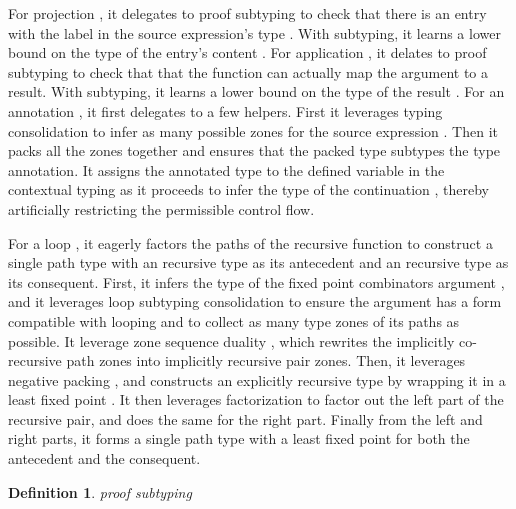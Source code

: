\documentclass[table,dvipsnames,acmsmall]{acmart}
\theoremstyle{definition}
\newtheorem{definition}{Definition}[section]
\begin{document}
For projection , 
it delegates to proof subtyping 
to check that there is an entry with the label 
in the source expression's type \ms{\tau}.
With subtyping, it learns a lower bound on the type of the entry's content \ms{\alpha}.
For application , 
it delates to proof subtyping 
to check that that the function  can actually
map the argument  to a result. With subtyping, 
it learns a lower bound on the type of the result \ms{\alpha}.
For an annotation , 
it first delegates to a few helpers. 
First it leverages typing consolidation 
to infer as many possible zones for the source expression .
Then it packs all the zones together and ensures that the packed type
subtypes the type annotation.
It assigns the annotated type to the defined variable in the contextual typing
as it proceeds to infer the type of the continuation , thereby
artificially restricting the permissible control flow. 


For a loop , 
it eagerly factors the paths of the recursive function 
to construct a single path type 
with an recursive type as its antecedent and an recursive type as its consequent. 
First, it infers the type of the fixed point combinators argument ,
and it leverages loop subtyping consolidation 
to ensure the argument has a  
form compatible with looping and 
to collect as many type zones of its paths as possible.  
It leverage zone sequence duality 
\ms{
  \alpha_\nu \downarrow \Pi_\nu
  \fallingdotseq 
  \alpha_\mu \uparrow \Pi_\mu
}, which rewrites the implicitly co-recursive path zones into
implicitly recursive pair zones. 
Then, it leverages negative packing ,
and constructs an explicitly recursive type by wrapping it in a least fixed point
.
It then leverages factorization  to factor out the left part of the recursive pair, and does the same for the right part. 
Finally from the left and right parts, it forms a single path type
with a least fixed point for both the antecedent and the consequent. 


\begin{definition} 
  \label{def:proof_subtyping}
  \emph{proof subtyping}
  \hfill
  \small
\end{definition}
\end{document}
